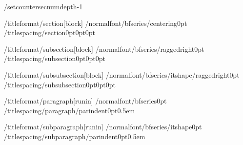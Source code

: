 %
/setcounter{secnumdepth}{-1}

/titleformat{/section}[block]
  {/normalfont/bfseries/centering}{}{0pt}{}
/titlespacing{/section}{0pt}{0pt}{0pt}

/titleformat{/subsection}[block]
  {/normalfont/bfseries/raggedright}{}{0pt}{}
/titlespacing{/subsection}{0pt}{0pt}{0pt}

/titleformat{/subsubsection}[block]
  {/normalfont/bfseries/itshape/raggedright}{}{0pt}{}
/titlespacing{/subsubsection}{0pt}{0pt}{0pt}

/titleformat{/paragraph}[runin]
  {/normalfont/bfseries}{}{0pt}{}
/titlespacing{/paragraph}{/parindent}{0pt}{0.5em}

/titleformat{/subparagraph}[runin]
  {/normalfont/bfseries/itshape}{}{0pt}{}
/titlespacing{/subparagraph}{/parindent}{0pt}{0.5em}

